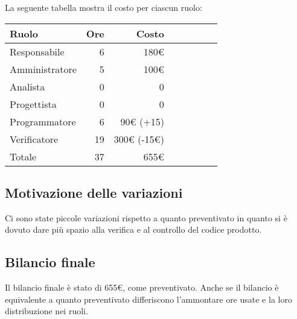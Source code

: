 La seguente tabella mostra il costo per ciascun ruolo:
\begin{table}[ht]
    \begin{tabularx}{\linewidth}{X|rrrrrrr}
    \rowcolor{gray!30}Ruolo & Ore & Costo \\
    \hline
    Responsabile                            & 6    & 180€\\
    \rowcolor{gray!10}Amministratore        & 5    & 100€  \\
    Analista                                & 0    & 0\\
    \rowcolor{gray!10}Progettista           & 0    & 0\\
    Programmatore                           & 6    & 90€ (+15) \\
    \rowcolor{gray!10}Verificatore          & 19   & 300€ (-15€) \\
    \hline Totale                           & 37   & 655€\\ 
    \end{tabularx}
\end{table}

\subsection{Motivazione delle variazioni}
Ci sono state piccole variazioni rispetto a quanto preventivato in quanto si è dovuto dare più spazio alla verifica e al controllo del codice prodotto.

\subsection{Bilancio finale}
Il bilancio finale è stato di 655€, come preventivato. Anche se il bilancio è equivalente a quanto preventivato differiscono l'ammontare ore usate e la loro distribuzione nei ruoli.
